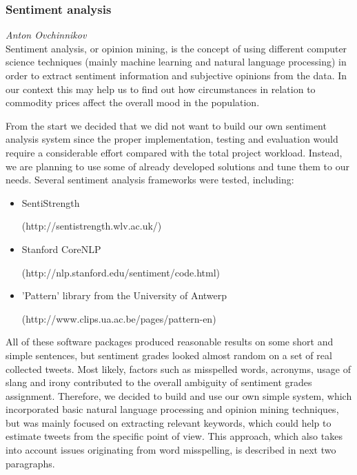 \subsubsection*{Sentiment analysis}
\emph{Anton Ovchinnikov} \\
Sentiment analysis, or opinion mining, is the concept of using different computer science techniques (mainly machine learning and natural language processing) in order to extract sentiment information and subjective opinions from the data. In our context this may help us to find out how circumstances in relation to commodity prices affect the overall mood in the population.

From the start we decided that we did not want to build our own sentiment analysis system since the proper implementation, testing and evaluation would require a considerable effort compared with the total project workload. Instead, we are planning to use some of already developed solutions and tune them to our needs.
\newline \newline
Several sentiment analysis frameworks were tested, including:

\begin{itemize}
\item SentiStrength \par (http://sentistrength.wlv.ac.uk/)

\item Stanford CoreNLP \par (http://nlp.stanford.edu/sentiment/code.html)

\item 'Pattern' library from the University of Antwerp \par (http://www.clips.ua.ac.be/pages/pattern-en)
\end{itemize}
All of these software packages produced reasonable results on some short and simple sentences, but sentiment grades looked almost random on a set of real collected tweets. Most likely, factors such as misspelled words, acronyms, usage of slang and irony contributed to the overall ambiguity of sentiment grades assignment.
\newline \newline
Therefore, we decided to build and use our own simple system, which incorporated basic natural language processing and opinion mining techniques, but was mainly focused on extracting relevant keywords, which could help to estimate tweets from the specific point of view. This approach, which also takes into account issues originating from word misspelling, is described in next two paragraphs.

